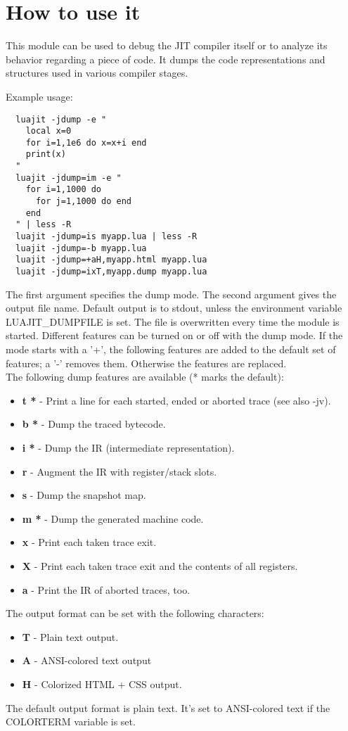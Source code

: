 \section{How to use it}
\label{Sec:dump-usage}
This module can be used to debug the JIT compiler itself or to analyze its
behavior regarding a piece of code. It dumps the
code representations and structures used in various compiler stages.

Example usage:
\begin{lstlisting}
  luajit -jdump -e "
    local x=0
    for i=1,1e6 do x=x+i end
    print(x)
  "
  luajit -jdump=im -e "
    for i=1,1000 do
      for j=1,1000 do end
    end
  " | less -R
  luajit -jdump=is myapp.lua | less -R
  luajit -jdump=-b myapp.lua
  luajit -jdump=+aH,myapp.html myapp.lua
  luajit -jdump=ixT,myapp.dump myapp.lua
\end{lstlisting}
The first argument specifies the dump mode. The second argument gives
the output file name. Default output is to stdout, unless the environment
variable LUAJIT\_DUMPFILE is set. The file is overwritten every time the
module is started. Different features can be turned on or off with the dump mode.
If the mode starts with a '+', the following features are added to the default
set of features; a '-' removes them. Otherwise the features are replaced.\\
The following dump features are available (* marks the default):

\begin{itemize}
  \item \textbf{t *} - Print a line for each started, ended or aborted trace (see also -jv).
  \item \textbf{b *} - Dump the traced bytecode.
  \item \textbf{i *} - Dump the IR (intermediate representation).
  \item \textbf{r} - Augment the IR with register/stack slots.
  \item \textbf{s} - Dump the snapshot map.
  \item \textbf{m *} - Dump the generated machine code.
  \item \textbf{x} - Print each taken trace exit.
  \item \textbf{X} - Print each taken trace exit and the contents of all registers.
  \item \textbf{a} - Print the IR of aborted traces, too.
\end{itemize}
The output format can be set with the following characters:
\begin{itemize}
   \item \textbf{T} - Plain text output.
   \item \textbf{A} - ANSI-colored text output
   \item \textbf{H} - Colorized HTML + CSS output.
\end{itemize}
The default output format is plain text. It's set to ANSI-colored text
if the COLORTERM variable is set.

